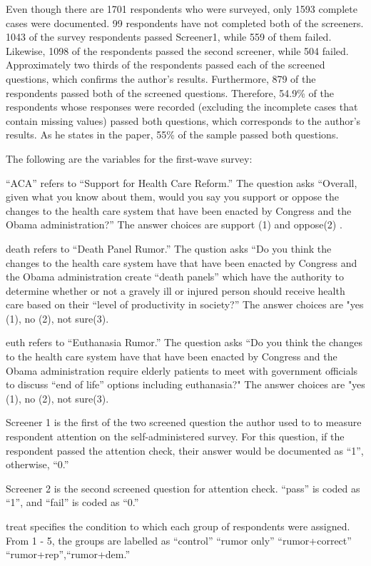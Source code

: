 \documentclass[AER]{AEA}
\begin{document}
Even though there are 1701 respondents who were surveyed, only 1593
complete cases were documented. 99 respondents have not completed both
of the screeners. 1043 of the survey respondents passed Screener1, while
559 of them failed. Likewise, 1098 of the respondents passed the second
screener, while 504 failed. Approximately two thirds of the respondents
passed each of the screened questions, which confirms the author's
results. Furthermore, 879 of the respondents passed both of the screened
questions. Therefore, 54.9\% of the respondents whose responses were
recorded (excluding the incomplete cases that contain missing values)
passed both questions, which corresponds to the author's results. As he
states in the paper, 55\% of the sample passed both questions.

The following are the variables for the first-wave survey:

``ACA'' refers to ``Support for Health Care Reform.'' The question asks
``Overall, given what you know about them, would you say you support or
oppose the changes to the health care system that have been enacted by
Congress and the Obama administration?'' The answer choices are support
(1) and oppose(2) .

death refers to ``Death Panel Rumor.'' The qustion asks ``Do you think
the changes to the health care system have that have been enacted by
Congress and the Obama administration create ``death panels'' which have
the authority to determine whether or not a gravely ill or injured
person should receive health care based on their ``level of productivity
in society?'' The answer choices are "yes (1), no (2), not sure(3).

euth refers to ``Euthanasia Rumor.'' The question asks ``Do you think
the changes to the health care system have that have been enacted by
Congress and the Obama administration require elderly patients to meet
with government officials to discuss ``end of life'' options including
euthanasia?" The answer choices are "yes (1), no (2), not sure(3).

Screener 1 is the first of the two screened question the author used to
to measure respondent attention on the self-administered survey. For
this question, if the respondent passed the attention check, their
answer would be documented as ``1'', otherwise, ``0.''

Screener 2 is the second screened question for attention check. ``pass''
is coded as ``1'', and ``fail'' is coded as ``0.''

treat specifies the condition to which each group of respondents were
assigned. From 1 - 5, the groups are labelled as ``control'' ``rumor
only'' ``rumor+correct'' ``rumor+rep'',``rumor+dem.''
\end{document}

